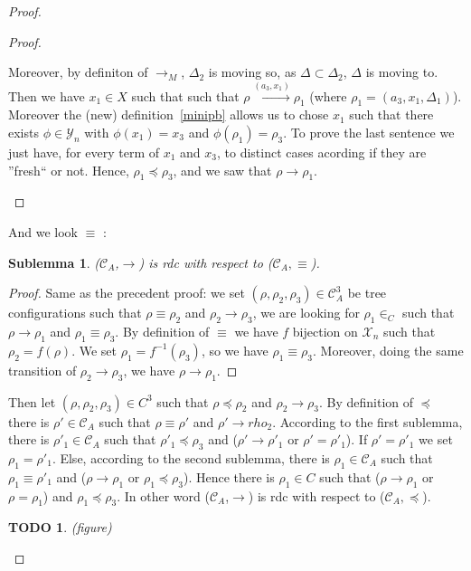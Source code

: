 \documentclass[a4paper,10pt]{report}
\newtheorem{slm}{Sublemma}[lm]
\newtheorem{td}{TODO}
\newcommand{\C}{\mathcal{C}_{A}}
\newcommand{\X}{\mathcal{X}_{n}}
\newcommand{\Y}{\mathcal{Y}_{n}}
\begin{document}
\begin{proof}
\begin{proof}
\begin{itemize}
     Moreover, by definiton of $\rightarrow_{M}$, $\Delta_2$ is moving so, as $\Delta \subset \Delta_2$, $\Delta$ is moving to.
     Then we have $x_1 \in X$ such that  such that $\rho \xrightarrow{(a_3,x_1)} \rho_1$ (where  $\rho_1 = (a_3,x_1,\Delta_1)$).
     Moreover the (new) definition~\ref{minipb} allows us to chose $x_1$ such that there exists $\phi \in \Y$ with $\phi(x_1) = x_3$ and $\phi(\rho_1) = \rho_3$. 
     To prove the last sentence we just have, for every term of $x_1$ and $x_3$, to distinct cases acording if they are ''fresh`` or not.
     Hence, $\rho_1 \preceq \rho_3$, and we saw that $\rho \rightarrow \rho_1$.
   \end{itemize}   
  \end{proof}
  And we look $\equiv$ :
  \begin{slm}
    ($\C$,$\rightarrow$) is rdc with respect to ($\C,\equiv$).
  \end{slm}
  \begin{proof}
    Same as the precedent proof: we set $(\rho, \rho_2  , \rho_3) \in \C^3 $ be tree configurations 
   such that $\rho \equiv \rho_2$ and $\rho_2 \rightarrow \rho_3$, we are looking for $\rho_1 \in _C$ such that $\rho \rightarrow \rho_1$  and $\rho_1 \equiv \rho_3$.
   By definition of $\equiv$ we have $f$ bijection on $\X$ such that $\rho_2 = f(\rho)$.  We set $\rho_1 = f^{-1}(\rho_3)$, so we have $\rho_1 \equiv \rho_3$.
   Moreover, doing the same transition of $\rho_2 \rightarrow \rho_3$, we have $\rho \rightarrow \rho_1$.    
  \end{proof}
  Then let $(\rho,\rho_2,\rho_3) \in C^3 $ such that $ \rho \preceq \rho_2 $ and $ \rho_2 \rightarrow \rho_3$.
  By definition of $\preceq$ there is $\rho' \in \C$ such that $\rho \equiv \rho'$ and $\rho' \rightarrow rho_2$.
  According to the first sublemma, there is $\rho'_1 \in \C$ such that $\rho'_1 \preceq \rho_3$ and ($\rho' \rightarrow \rho'_1$ or $\rho' = \rho'_1$).
  If $\rho' = \rho'_1$ we set $\rho_1 = \rho'_1$.
  Else, according to the second sublemma, there is $\rho_1 \in \C$ such that $\rho_1 \equiv \rho'_1$ and ($\rho \rightarrow \rho_1$ or $\rho_1 \preceq \rho_3$).
  Hence there is $\rho_1 \in C $ such that ($\rho \rightarrow \rho_1$ or $\rho = \rho_1$) and $\rho_1 \preceq \rho_3$.
  In other word ($\C$,$\rightarrow$) is rdc with respect to ($\C,\preceq$).

 
   \begin{td}
      (figure)
   \end{td}
\end{proof}
\end{document}
